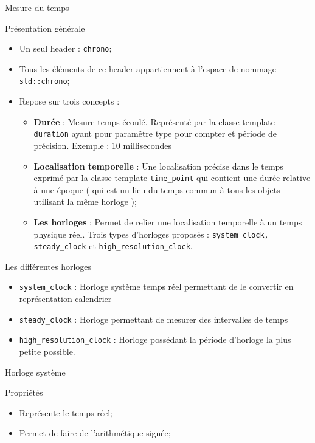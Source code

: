 \documentclass[handout,10pt]{beamer}
\newcommand{\includepartcode}[4][cpp]{

}
\begin{document}
\begin{frame}[fragile]{Mesure du temps}
 \tiny
 \begin{block}{Présentation générale}
  \begin{itemize}
   \item Un seul header : \lstinline$chrono$;
   \item Tous les éléments de ce header appartiennent à l'espace de nommage \lstinline$std::chrono$;
   \item Repose sur trois concepts :
   \begin{itemize}
   \item \textbf{Durée} : Mesure temps écoulé. Représenté par la classe template \lstinline$duration$ ayant pour paramêtre {\color{DarkGreen} type
   pour compter} et {\color{BrickRed} période de précision}. Exemple : {\color{DarkGreen}10} {\color{BrickRed}millisecondes}
   \item \textbf{Localisation temporelle} : Une localisation précise dans le temps exprimé par la classe template \lstinline$time_point$ qui contient une durée
   relative à une époque ( qui est un lieu du temps commun à tous les objets utilisant la même horloge );
   \item \textbf{Les horloges} : Permet de relier une localisation temporelle à un temps physique réel. Trois types d'horloges proposés : 
   \lstinline$system_clock, steady_clock$ et \lstinline$high_resolution_clock$.
   \end{itemize}
  \end{itemize}
 \end{block}
 
 \begin{block}{Les différentes horloges}
 \begin{itemize}
  \item \lstinline$system_clock$ : Horloge système temps réel permettant de le convertir en représentation calendrier
  \item \lstinline$steady_clock$ : Horloge permettant de mesurer des intervalles de temps
  \item \lstinline$high_resolution_clock$ : Horloge possédant la période d'horloge la plus petite possible.
 \end{itemize}
 \end{block}
 
\end{frame}

\begin{frame}[fragile]{Horloge système}
\tiny
\begin{block}{Propriétés}
\begin{itemize}
 \item Représente le temps réel;
 \item Permet de faire de l'arithmétique signée; 
\end{itemize}
\end{block}
\includepartcode{system_clock.cpp}{6}{17}
\end{frame}
\end{document}
